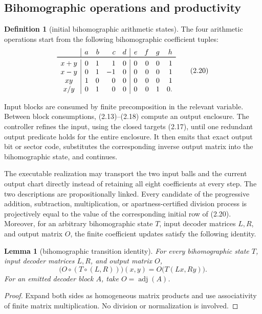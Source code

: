 \documentclass[10pt]{article}
\newtheorem{lemma}[theorem]{Lemma}
\theoremstyle{definition}
\newtheorem{definition}[theorem]{Definition}
\theoremstyle{remark}
\begin{document}
\subsection{Bihomographic operations and productivity}

\begin{definition}[initial bihomographic arithmetic states]
The four arithmetic operations start from the following bihomographic
coefficient tuples:
\[
\begin{array}{c|rrrr|rrrr}
 &a&b&c&d&e&f&g&h\\ \toprule
 x+y&0&1&1&0&0&0&0&1\\
 x-y&0&1&-1&0&0&0&0&1\\
 xy&1&0&0&0&0&0&0&1\\
 x/y&0&1&0&0&0&0&1&0.
\end{array}
\tag{2.20}
\]
\end{definition}

Input blocks are consumed by finite precomposition in the relevant variable.  Between block consumptions, (2.13)--(2.18) compute an output enclosure.  The controller refines the input, using the closed targets (2.17), until one redundant output predicate holds for the entire enclosure.  It then emits that exact output bit or sector code, substitutes the corresponding inverse output matrix into the bihomographic state, and continues.

The executable realization may transport the two input balls and the current
output chart directly instead of retaining all eight coefficients at every
step.  The two descriptions are propositionally linked.  Every candidate of
the progressive addition, subtraction, multiplication, or
apartness-certified division process is projectively equal to the value of
the corresponding initial row of (2.20).  Moreover, for an arbitrary
bihomographic state $T$, input decoder matrices $L,R$, and output matrix $O$,
the finite coefficient updates satisfy the following identity.

\begin{lemma}[bihomographic transition identity]
For every bihomographic state $T$, input decoder matrices $L,R$, and output
matrix $O$,
\[
 \bigl(O\circ(T\circ(L,R))\bigr)(x,y)
   =O\bigl(T(Lx,Ry)\bigr).
\tag{2.21}
\]
For an emitted decoder block $A$, take $O=\operatorname{adj}(A)$.
\end{lemma}

\begin{proof}
Expand both sides as homogeneous matrix products and use associativity of
finite matrix multiplication.  No division or normalization is involved.
\end{proof}
\end{document}
